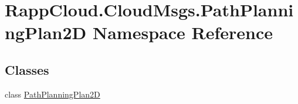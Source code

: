 \hypertarget{namespaceRappCloud_1_1CloudMsgs_1_1PathPlanningPlan2D}{\section{Rapp\-Cloud.\-Cloud\-Msgs.\-Path\-Planning\-Plan2\-D Namespace Reference}
\label{namespaceRappCloud_1_1CloudMsgs_1_1PathPlanningPlan2D}
}
\subsection*{Classes}
\begin{DoxyCompactItemize}
\item 
class \hyperlink{classRappCloud_1_1CloudMsgs_1_1PathPlanningPlan2D_1_1PathPlanningPlan2D}{Path\-Planning\-Plan2\-D}
\end{DoxyCompactItemize}
